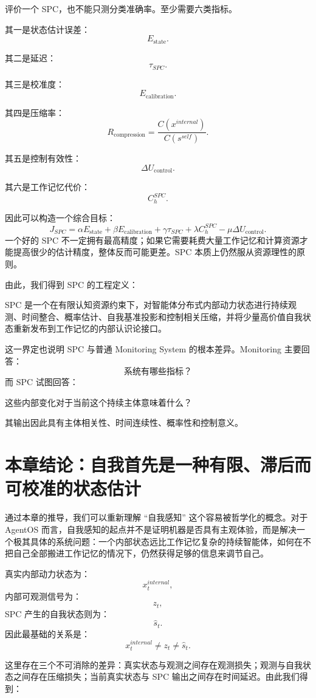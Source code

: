 评价一个 SPC，也不能只测分类准确率。至少需要六类指标。

其一是状态估计误差：
\[
E_{\mathrm{state}}.
\]

其二是延迟：
\[
\tau_{SPC}.
\]

其三是校准度：
\[
E_{\mathrm{calibration}}.
\]

其四是压缩率：
\[
R_{\mathrm{compression}}
=
\frac{
C(x^{internal})
}{
C(s^{self})
}.
\]

其五是控制有效性：
\[
\Delta U_{\mathrm{control}}.
\]

其六是工作记忆代价：
\[
C_{h}^{SPC}.
\]

因此可以构造一个综合目标：
\[
J_{SPC}
=
\alpha
E_{\mathrm{state}}
+
\beta
E_{\mathrm{calibration}}
+
\gamma
\tau_{SPC}
+
\lambda
C_h^{SPC}
-
\mu
\Delta U_{\mathrm{control}}.
\]
一个好的 SPC 不一定拥有最高精度；如果它需要耗费大量工作记忆和计算资源才能提高很少的估计精度，整体反而可能更差。SPC 本质上仍然服从资源理性的原则。

由此，我们得到 SPC 的工程定义：
\begin{definition*}
SPC 是一个在有限认知资源约束下，对智能体分布式内部动力状态进行持续观测、时间整合、概率估计、自我基准投影和控制相关压缩，并将少量高价值自我状态重新发布到工作记忆的内部认识论接口。
\end{definition*}

这一界定也说明 SPC 与普通 Monitoring System 的根本差异。Monitoring 主要回答：
\[
\text{系统有哪些指标？}
\]
而 SPC 试图回答：
\begin{statementbox}
这些内部变化对于当前这个持续主体意味着什么？
\end{statementbox}
其输出因此具有主体相关性、时间连续性、概率性和控制意义。

\section{本章结论：自我首先是一种有限、滞后而可校准的状态估计}

通过本章的推导，我们可以重新理解 ``自我感知'' 这个容易被哲学化的概念。对于 AgentOS 而言，自我感知的起点并不是证明机器是否具有主观体验，而是解决一个极其具体的系统问题：一个内部状态远比工作记忆复杂的持续智能体，如何在不把自己全部搬进工作记忆的情况下，仍然获得足够的信息来调节自己。

真实内部动力状态为：
\[
x_t^{internal},
\]
内部可观测信号为：
\[
z_t,
\]
SPC 产生的自我状态则为：
\[
\hat{s}_t.
\]
因此最基础的关系是：
\[
\boxed{
x_t^{internal}
\neq
z_t
\neq
\hat{s}_t.
}
\]

这里存在三个不可消除的差异：真实状态与观测之间存在观测损失；观测与自我状态之间存在压缩损失；当前真实状态与 SPC 输出之间存在时间延迟。由此我们得到：
\begin{statementbox}
\centering
{}
\end{statementbox}

